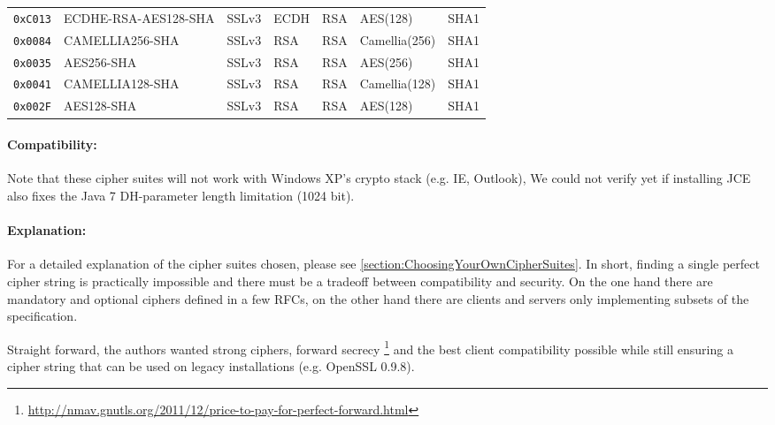 \begin{center}
\begin{tabular}{lllllll}
\verb|0xC013| & ECDHE-RSA-AES128-SHA        & SSLv3            & ECDH           & RSA           & AES(128)        & SHA1         \\
\verb|0x0084| & CAMELLIA256-SHA             & SSLv3            & RSA            & RSA           & Camellia(256)   & SHA1         \\
\verb|0x0035| & AES256-SHA                  & SSLv3            & RSA            & RSA           & AES(256)        & SHA1         \\
\verb|0x0041| & CAMELLIA128-SHA             & SSLv3            & RSA            & RSA           & Camellia(128)   & SHA1         \\
\verb|0x002F| & AES128-SHA                  & SSLv3            & RSA            & RSA           & AES(128)        & SHA1         \\
\bottomrule
\end{tabular}
\end{center}

\paragraph*{Compatibility: }

Note that these cipher suites will not work with Windows XP's crypto stack (e.g. IE, Outlook), 
We could not verify yet if installing JCE also fixes the Java 7
DH-parameter length limitation (1024 bit). 

\paragraph*{Explanation: }

For a detailed explanation of the cipher suites chosen, please see
\ref{section:ChoosingYourOwnCipherSuites}. In short, finding a single perfect cipher
string is practically impossible and there must be a tradeoff between compatibility and security. 
On the one hand there are mandatory and optional ciphers defined in a few RFCs, 
on the other hand there are clients and servers only implementing subsets of the 
specification.

Straight forward, the authors wanted strong ciphers, forward secrecy
\footnote{\url{http://nmav.gnutls.org/2011/12/price-to-pay-for-perfect-forward.html}}
and the best client compatibility possible while still ensuring a cipher string that can be
used on legacy installations (e.g. OpenSSL 0.9.8). 

